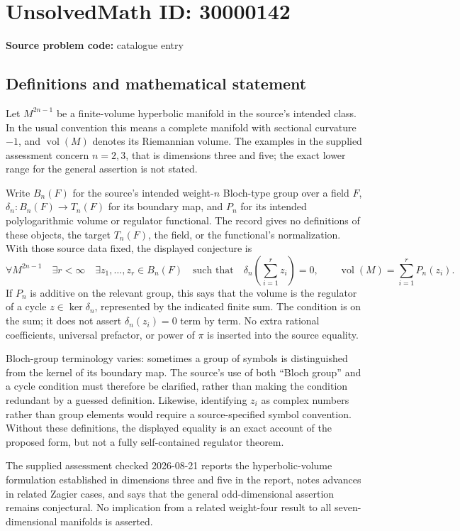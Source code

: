 \documentclass[11pt]{article}
\begin{document}
\section*{UnsolvedMath ID: 30000142}
\textbf{Source problem code:} catalogue entry
\subsection{Definitions and mathematical statement}
Let \(M^{2n-1}\) be a finite-volume hyperbolic manifold in the source's intended class. In the usual convention this means a complete manifold with sectional curvature \(-1\), and \(\operatorname{vol}(M)\) denotes its Riemannian volume. The examples in the supplied assessment concern \(n=2,3\), that is dimensions three and five; the exact lower range for the general assertion is not stated.

Write \(B_n(F)\) for the source's intended weight-\(n\) Bloch-type group over a field \(F\), \(\delta_n:B_n(F)\to T_n(F)\) for its boundary map, and \(P_n\) for its intended polylogarithmic volume or regulator functional. The record gives no definitions of these objects, the target \(T_n(F)\), the field, or the functional's normalization. With those source data fixed, the displayed conjecture is
\[
\forall M^{2n-1}\quad\exists r<\infty\quad\exists z_1,\ldots,z_r\in B_n(F)
\quad\text{such that}\quad
\delta_n\left(\sum_{i=1}^r z_i\right)=0,
\qquad
\operatorname{vol}(M)=\sum_{i=1}^r P_n(z_i).
\]
If \(P_n\) is additive on the relevant group, this says that the volume is the regulator of a cycle \(z\in\ker\delta_n\), represented by the indicated finite sum. The condition is on the sum; it does not assert \(\delta_n(z_i)=0\) term by term. No extra rational coefficients, universal prefactor, or power of \(\pi\) is inserted into the source equality.

Bloch-group terminology varies: sometimes a group of symbols is distinguished from the kernel of its boundary map. The source's use of both ``Bloch group'' and a cycle condition must therefore be clarified, rather than making the condition redundant by a guessed definition. Likewise, identifying \(z_i\) as complex numbers rather than group elements would require a source-specified symbol convention. Without these definitions, the displayed equality is an exact account of the proposed form, but not a fully self-contained regulator theorem.

The supplied assessment checked 2026-08-21 reports the hyperbolic-volume formulation established in dimensions three and five in the report, notes advances in related Zagier cases, and says that the general odd-dimensional assertion remains conjectural. No implication from a related weight-four result to all seven-dimensional manifolds is asserted.
\end{document}
